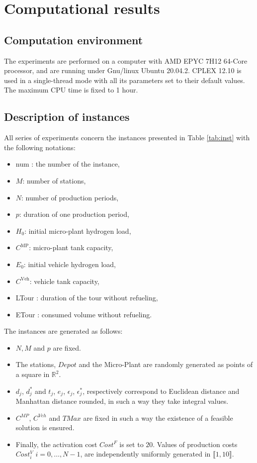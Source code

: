 \documentclass[11pt]{article}
\theoremstyle{plain}%
\theoremstyle{definition} \newtheorem{lem}{Lemma}[section]
\theoremstyle{definition} \newtheorem{claim}{Claim}[lem]
\theoremstyle{definition} \newtheorem{theorem}{Theorem}[section]
\theoremstyle{definition} \newtheorem{exo}{Exercice n$^\circ$}
\theoremstyle{definition} \newtheorem{quest}{}[exo]
\theoremstyle{definition} \newtheorem{sousquest}{}[quest]
\theoremstyle{remark}
\theoremstyle{definition}
\begin{document}
\section{Computational results }\label{sec6}
\subsection{Computation environment}
The experiments are performed on a computer with AMD EPYC 7H12 64-Core processor, and 
are running under Gnu/linux Ubuntu 20.04.2. 
 CPLEX 12.10 is used in a single-thread mode with all its parameters  set to their default values. 
The maximum CPU time is fixed to 1 hour.
\subsection{Description of instances}
All series of  experiments concern the instances presented in Table \ref{tab:inst} with the following notations:

\begin{itemize}
\item num : the number of the instance,
 \item $M$: number of stations,
 \item $N$: number of production periods,
 \item $p$: duration of one production period,
 \item $H_0$: initial micro-plant hydrogen load,
  \item $C^{\textrm{MP}}$: micro-plant tank capacity,
 \item $E_0$: initial vehicle hydrogen load,
 \item $C^{\textrm{Veh}}$: vehicle tank capacity,
    \item LTour : duration of the tour without refueling,
    \item ETour : consumed volume without refueling.
\end{itemize}

The instances are generated as follows:
\begin{itemize}
\item $N, M$ and $p$ are fixed. 
\item The stations, $Depot$ and the Micro-Plant are randomly generated as points of a square in $\mathbb{R}^2$.
\item  $d_j$, $d^*_j$ and $t_j$, $e_j$, $\epsilon_j$, $\epsilon^*_j$, respectively correspond to Euclidean distance and Manhattan distance rounded, in such a way they take integral values.
\item $C^{MP}$, $C^{Veh}$ and $TMax$ are fixed in such a way the existence of a feasible solution is ensured.
 \item Finally, the activation cost  $Cost^F$ is set to $20$. 
Values of production costs $Cost^V_i$ $i = 0,\dots,N -1$, are independently uniformly generated in  $\llbracket 1, 10 \rrbracket$.
\end{itemize}
\end{document}
